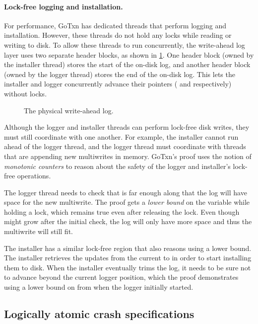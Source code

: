 \paragraph{Lock-free logging and installation.}
For performance, GoTxn has dedicated threads that perform logging and
installation.  However, these threads do not hold any locks while reading
or writing to disk.  To allow these threads to run concurrently, the write-ahead
log layer
uses two separate header blocks, as shown in \cref{fig:physlog}.
One header block (owned by the installer thread) stores the start of
the on-disk log, and another header block (owned by the logger thread)
stores the end of the on-disk log.  This lets the installer and logger
concurrently advance their pointers ( and 
respectively) without locks.

\begin{figure}
    \centering
    
    \caption{The physical write-ahead log.}
    \label{fig:physlog}
\end{figure}

Although the logger and installer threads can perform lock-free disk
writes, they must still coordinate with one another.  For example,
the installer cannot run ahead of the logger thread, and the logger
thread must coordinate with threads that are appending new multiwrites
in memory. GoTxn's proof uses the notion of \emph{monotonic counters} to reason
about the safety of the logger and installer's lock-free operations.

The logger thread needs to check that  is far enough along that the
log will have space for the new multiwrite. The proof gets a \emph{lower bound}
on the  variable while holding a lock, which remains true even
after releasing the lock. Even though  might grow after the initial
check, the log will only have more space and thus the multiwrite will still fit.

The installer has a similar lock-free region that also reasons using a lower
bound. The installer retrieves the updates from the current  to
 in order to start installing them to disk. When the installer
eventually trims the log, it needs to be sure not to advance beyond the current
logger position, which the proof demonstrates using a lower bound on
 from when the logger initially started.

\subsection{Logically atomic crash specifications}
\label{sec:txn:logatom}

